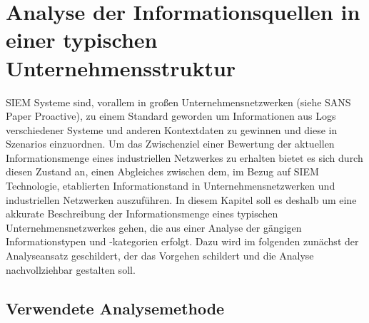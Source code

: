 \chapter{Analyse der Informationsquellen in einer typischen Unternehmensstruktur}
\label{cha:Analyse der Informationsquellen in einer typischen Unternehmensstruktur}

SIEM Systeme sind, vorallem in großen Unternehmensnetzwerken (siehe SANS Paper Proactive), zu einem Standard geworden um Informationen aus Logs verschiedener Systeme und anderen Kontextdaten zu gewinnen und diese in Szenarios einzuordnen. Um das Zwischenziel einer Bewertung der aktuellen Informationsmenge eines industriellen Netzwerkes zu erhalten bietet es sich durch diesen Zustand an, einen Abgleiches zwischen dem, im Bezug auf SIEM Technologie, etablierten Informationstand in Unternehmensnetzwerken und industriellen Netzwerken auszuführen. In diesem Kapitel soll es deshalb um eine akkurate Beschreibung der Informationsmenge eines typischen Unternehmensnetzwerkes gehen, die aus einer Analyse der gängigen Informationstypen und -kategorien erfolgt. Dazu wird im folgenden zunächst der Analyseansatz geschildert, der das Vorgehen schildert und die Analyse nachvollziehbar gestalten soll.

\section{Verwendete Analysemethode}

